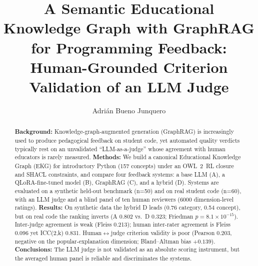\documentclass[sageh]{sagej}
\begin{document}

\title{A Semantic Educational Knowledge Graph with GraphRAG for Programming Feedback: Human-Grounded Criterion Validation of an LLM Judge}

\author{Adrián Bueno Junquero}



\begin{abstract}
\textbf{Background:} Knowledge-graph-augmented generation (GraphRAG) is increasingly used to produce pedagogical feedback on student code, yet automated quality verdicts typically rest on an unvalidated ``LLM-as-a-judge'' whose agreement with human educators is rarely measured.
\textbf{Methods:} We build a canonical Educational Knowledge Graph (EKG) for introductory Python (157 concepts) under an OWL~2~RL closure and SHACL constraints, and compare four feedback systems: a base LLM (A), a QLoRA-fine-tuned model (B), GraphRAG (C), and a hybrid (D). Systems are evaluated on a synthetic held-out benchmark (n=50) and on real student code (n=60), with an LLM judge and a blind panel of ten human reviewers (6000 dimension-level ratings).
\textbf{Results:} On synthetic data the hybrid D leads (0.76 category, 0.54 concept), but on real code the ranking inverts (A 0.802 vs.\ D 0.323; Friedman $p=8.1\times10^{-15}$). Inter-judge agreement is weak (Fleiss 0.213); human inter-rater agreement is Fleiss 0.096 yet ICC(2,k) 0.831. Human$\leftrightarrow$judge criterion validity is poor (Pearson 0.203, negative on the popular-explanation dimension; Bland--Altman bias $+0.139$).
\textbf{Conclusions:} The LLM judge is not validated as an absolute scoring instrument, but the averaged human panel is reliable and discriminates the systems.
\end{abstract}


\maketitle
\end{document}

